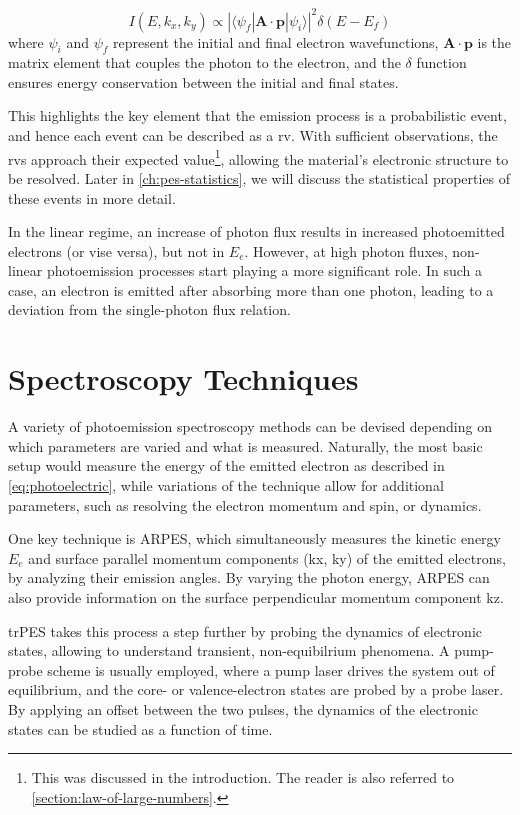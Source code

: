 \begin{equation}
    I(E, k_x, k_y) \propto |\langle \psi_f | \mathbf{A} \cdot \mathbf{p} | \psi_i \rangle|^2 \delta(E - E_f)
\end{equation}
where $\psi_i$ and $\psi_f$ represent the initial and final electron wavefunctions, $\mathbf{A} \cdot \mathbf{p}$ is the matrix element that couples the photon to the electron, and the $\delta$ function ensures energy conservation between the initial and final states.

This highlights the key element that the emission process is a probabilistic event, and hence each event can be described as a \gls{rv}. With sufficient observations, the \glspl{rv} approach their expected value\footnote{This was discussed in the introduction. The reader is also referred to \cref{section:law-of-large-numbers}.}, allowing the material's electronic structure to be resolved. Later in \cref{ch:pes-statistics}, we will discuss the statistical properties of these events in more detail.

In the linear regime, an increase of photon flux results in increased photoemitted electrons (or vise versa), but not in $E_e$. However, at high photon fluxes, non-linear photoemission processes start playing a more significant role. In such a case, an electron is emitted after absorbing more than one photon, leading to a deviation from the single-photon flux relation. 

\section{Spectroscopy Techniques}
A variety of photoemission spectroscopy methods can be devised depending on which parameters are varied and what is measured. Naturally, the most basic setup would measure the energy of the emitted electron as described in \cref{eq:photoelectric}, while variations of the technique allow for additional parameters, such as resolving the electron momentum and spin, or dynamics.

One key technique is \gls{ARPES}, which simultaneously measures the kinetic energy $E_e$ and surface parallel momentum components (\gls{kx}, \gls{ky}) of the emitted electrons, by analyzing their emission angles. By varying the photon energy, \gls{ARPES} can also provide information on the surface perpendicular momentum component \gls{kz}. 

\Gls{trPES} takes this process a step further by probing the dynamics of electronic states, allowing to understand transient, non-equibilrium phenomena. A pump-probe scheme is usually employed, where a pump laser drives the system out of equilibrium, and the core- or valence-electron states are probed by a probe laser. By applying an offset between the two pulses, the dynamics of the electronic states can be studied as a function of time.

